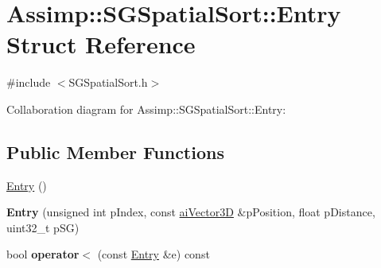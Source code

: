 \hypertarget{struct_assimp_1_1_s_g_spatial_sort_1_1_entry}{\section{Assimp\+:\+:S\+G\+Spatial\+Sort\+:\+:Entry Struct Reference}
\label{struct_assimp_1_1_s_g_spatial_sort_1_1_entry}
}


{\ttfamily \#include $<$S\+G\+Spatial\+Sort.\+h$>$}



Collaboration diagram for Assimp\+:\+:S\+G\+Spatial\+Sort\+:\+:Entry\+:
\subsection*{Public Member Functions}
\begin{DoxyCompactItemize}
\item 
\hyperlink{struct_assimp_1_1_s_g_spatial_sort_1_1_entry_a4cd09b8849231f9644b111d94a40f180}{Entry} ()
\item 
\hypertarget{struct_assimp_1_1_s_g_spatial_sort_1_1_entry_a9df0a8d9d8744ac95d829269531b44ad}{{\bfseries Entry} (unsigned int p\+Index, const \hyperlink{structai_vector3_d}{ai\+Vector3\+D} \&p\+Position, float p\+Distance, uint32\+\_\+t p\+S\+G)}\label{struct_assimp_1_1_s_g_spatial_sort_1_1_entry_a9df0a8d9d8744ac95d829269531b44ad}

\item 
\hypertarget{struct_assimp_1_1_s_g_spatial_sort_1_1_entry_a0314c66d32cb3dea999b57f680045133}{bool {\bfseries operator$<$} (const \hyperlink{struct_assimp_1_1_s_g_spatial_sort_1_1_entry}{Entry} \&e) const }\label{struct_assimp_1_1_s_g_spatial_sort_1_1_entry_a0314c66d32cb3dea999b57f680045133}

\end{DoxyCompactItemize}
